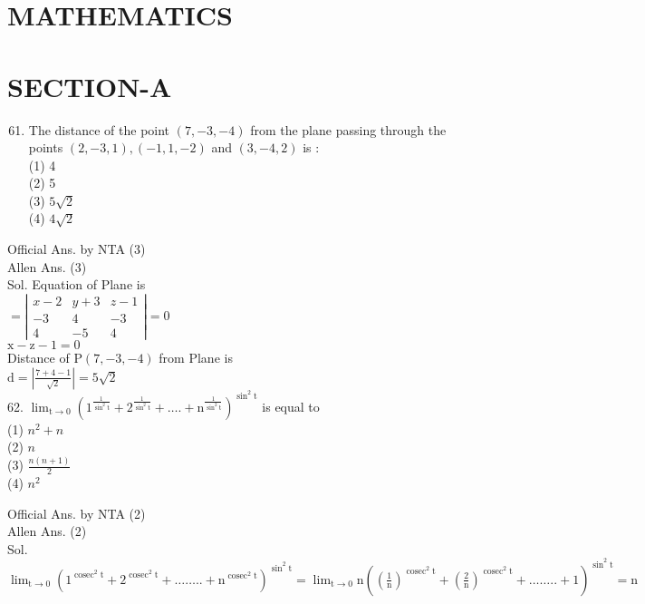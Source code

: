 \documentclass[10pt]{article}
\begin{document}
\section*{MATHEMATICS}
\section*{SECTION-A}
\begin{enumerate}
  \setcounter{enumi}{60}
  \item The distance of the point \((7,-3,-4)\) from the plane passing through the points \((2,-3,1),(-1,1,-2)\) and \((3,-4,2)\) is :\\
(1) 4\\
(2) 5\\
(3) \(5 \sqrt{2}\)\\
(4) \(4 \sqrt{2}\)
\end{enumerate}

Official Ans. by NTA (3)\\
Allen Ans. (3)\\
Sol. Equation of Plane is\\
\(=\left|\begin{array}{ccc}x-2 & y+3 & z-1 \\ -3 & 4 & -3 \\ 4 & -5 & 4\end{array}\right|=0\)\\
\(\mathrm{x}-\mathrm{z}-1=0\)\\
Distance of \(\mathrm{P}(7,-3,-4)\) from Plane is\\
\(\mathrm{d}=\left|\frac{7+4-1}{\sqrt{2}}\right|=5 \sqrt{2}\)\\
62. \(\lim _{\mathrm{t} \rightarrow 0}\left(1^{\frac{1}{\sin ^{2} \mathrm{t}}}+2^{\frac{1}{\sin ^{2} \mathrm{t}}}+\ldots .+\mathrm{n}^{\frac{1}{\sin ^{2} \mathrm{t}}}\right)^{\sin ^{2} \mathrm{t}}\) is equal to\\
(1) \(n^{2}+n\)\\
(2) \(n\)\\
(3) \(\frac{n(n+1)}{2}\)\\
(4) \(n^{2}\)

Official Ans. by NTA (2)\\
Allen Ans. (2)\\
Sol. \(\lim _{\mathrm{t} \rightarrow 0}\left(1^{\operatorname{cosec}^{2} \mathrm{t}}+2^{\operatorname{cosec}^{2} \mathrm{t}}+\ldots \ldots . .+\mathrm{n}^{\operatorname{cosec}^{2} \mathrm{t}}\right)^{\sin ^{2} \mathrm{t}} =\lim _{\mathrm{t} \rightarrow 0} \mathrm{n}\left(\left(\frac{1}{\mathrm{n}}\right)^{\operatorname{cosec}^{2} \mathrm{t}}+\left(\frac{2}{\mathrm{n}}\right)^{\operatorname{cosec}^{2} \mathrm{t}}+\ldots \ldots . .+1\right)^{\sin ^{2} \mathrm{t}} =\mathrm{n}\)
\end{document}
